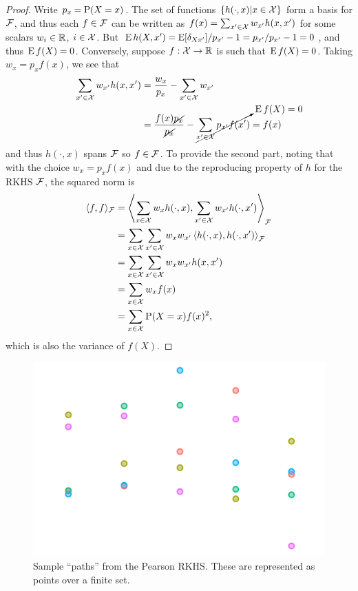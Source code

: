 \begin{proof}
  Write $p_x = \operatorname{P}(X=x)$.
  The set of functions $\{h(\cdot,x) | x \in {\mathcal X}\}$ form a basis for ${\mathcal F}$, and thus each $f \in {\mathcal F}$ can be written as $f(x) = \sum_{x'\in{\mathcal X}} w_{x'}h(x,x')$ for some scalars $w_i\in\mathbb{R}$, $i\in{\mathcal X}$.
  But $\operatorname{E} h(X,x') = \operatorname{E} [\delta_{Xx'}] / p_{x'} - 1 = p_{x'} / p_{x'} - 1 = 0$, and thus $\operatorname{E} f(X) = 0$.
  Conversely, suppose $f:{\mathcal X}\to\mathbb{R}$ is such that $\operatorname{E} f(X) = 0$.
  Taking $w_x = p_xf(x)$, we see that
  \begin{align*}
    \sum_{x'\in{\mathcal X}} w_{x'}h(x,x') 
    &= \frac{w_x}{p_x} - \sum_{x'\in{\mathcal X}} w_{x'} \\
    &= \frac{f(x)\cancel{p_x}}{\cancel{p_x}} - \cancelto{\operatorname{E} f(X) = 0}{\sum_{x'\in{\mathcal X}} p_{x'}f(x')} = f(x)
  \end{align*}
  and thus $h(\cdot,x)$ spans ${\mathcal F}$ so $f\in{\mathcal F}$.
  To provide the second part, noting that with the choice $w_x = p_xf(x)$ and due to the reproducing property of $h$ for the RKHS ${\mathcal F}$, the squared norm is 
  \begin{align*}
    \langle f,f\rangle_{\mathcal F} 
    &= \left\langle \sum_{x\in{\mathcal X}} w_{x}h(\cdot,x), \sum_{x'\in{\mathcal X}} w_{x'}h(\cdot,x') \right\rangle_{\mathcal F} \\
    &= \sum_{x\in{\mathcal X}} \sum_{x'\in{\mathcal X}} w_{x} w_{x'} \left\langle h(\cdot,x), h(\cdot,x') \right\rangle_{\mathcal F} \\
    &= \sum_{x\in{\mathcal X}} \sum_{x'\in{\mathcal X}} w_{x} w_{x'} h(x,x')  \\
    &= \sum_{x\in{\mathcal X}} w_{x} f(x) \\
    &= \sum_{x\in{\mathcal X}} \operatorname{P}(X=x) f(x)^2,
  \end{align*}
  which is also the variance of $f(X)$.
\end{proof}

\begin{figure}[hbt]
  \centering
  \includegraphics[scale=0.15]{figure/kernel_path_pearson_th}
  \caption{Sample ``paths'' from the Pearson RKHS. These are represented as points over a finite set.}
\end{figure}

